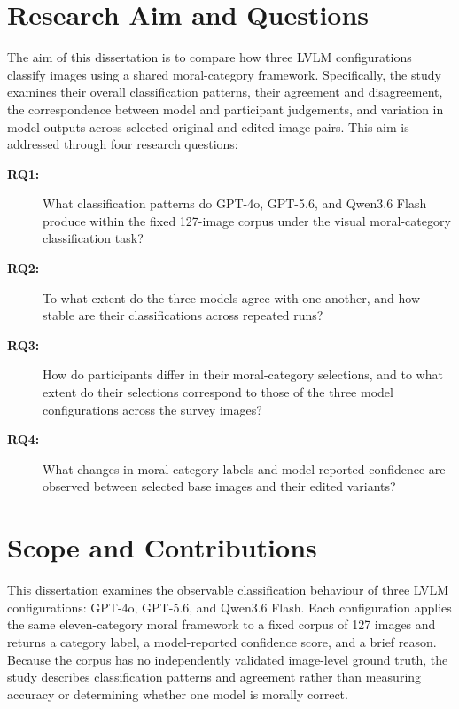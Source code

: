 \section{Research Aim and Questions}

The aim of this dissertation is to compare how three LVLM configurations
classify images using a shared moral-category framework. Specifically, the
study examines their overall classification patterns, their agreement and
disagreement, the correspondence between model and participant judgements,
and variation in model outputs across selected original and edited image
pairs. This aim is addressed through four research questions:

\begin{description}

\item[\textbf{RQ1:}] What classification patterns do GPT-4o, GPT-5.6, and
Qwen3.6 Flash produce within the fixed 127-image corpus under the visual
moral-category classification task?

\item[\textbf{RQ2:}] To what extent do the three models agree with one
another, and how stable are their classifications across repeated runs?

\item[\textbf{RQ3:}] How do participants differ in their moral-category
selections, and to what extent do their selections correspond to those of
the three model configurations across the survey images?

\item[\textbf{RQ4:}] What changes in moral-category labels and model-reported
confidence are observed between selected base images and their edited
variants?

\end{description}

\section{Scope and Contributions}

This dissertation examines the observable classification behaviour of three
LVLM configurations: GPT-4o, GPT-5.6, and Qwen3.6 Flash. Each configuration
applies the same eleven-category moral framework to a fixed corpus of 127
images and returns a category label, a model-reported confidence score, and a
brief reason. Because the corpus has no independently validated image-level
ground truth, the study describes classification patterns and agreement rather
than measuring accuracy or determining whether one model is morally correct.

